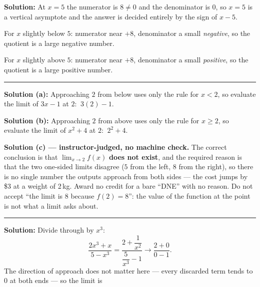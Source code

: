 \documentclass[12pt]{article}
\begin{document}
\textbf{Solution:} At $x = 5$ the numerator is $8 \neq 0$ and the denominator is
$0$, so $x = 5$ is a vertical asymptote and the answer is decided entirely by the
sign of $x - 5$.

For $x$ slightly below $5$: numerator near $+8$, denominator a small
\emph{negative}, so the quotient is a large negative number. \ans{-\infty}

For $x$ slightly above $5$: numerator near $+8$, denominator a small
\emph{positive}, so the quotient is a large positive number. \ans{+\infty}

\vspace{0.2cm}\noindent\rule{\linewidth}{0.2pt}\vspace{0.2cm}


\textbf{Solution (a):} Approaching $2$ from below uses only the rule for
$x < 2$, so evaluate the limit of $3x - 1$ at $2$: $\ 3(2) - 1$. 

\textbf{Solution (b):} Approaching $2$ from above uses only the rule for
$x \ge 2$, so evaluate the limit of $x^2 + 4$ at $2$: $\ 2^2 + 4$. 

\textbf{Solution (c) --- instructor-judged, no machine check.} The correct
conclusion is that $\lim_{x\to2} f(x)$ \textbf{does not exist}, and the required
reason is that the two one-sided limits disagree ($5$ from the left, $8$ from the
right), so there is no single number the outputs approach from both sides ---
the cost jumps by \$3 at a weight of 2\,kg. Award no credit for a bare ``DNE''
with no reason. Do not accept ``the limit is 8 because $f(2) = 8$'': the value
of the function at the point is not what a limit asks about.

\vspace{0.2cm}\noindent\rule{\linewidth}{0.2pt}\vspace{0.2cm}


\textbf{Solution:} Divide through by $x^3$:
\[
  \frac{2x^3 + x}{5 - x^3} = \frac{2 + \dfrac{1}{x^2}}{\dfrac{5}{x^3} - 1}
  \longrightarrow \frac{2 + 0}{0 - 1}.
\]
The direction of approach does not matter here --- every discarded term tends to
$0$ at both ends --- so the limit is 
\end{document}
